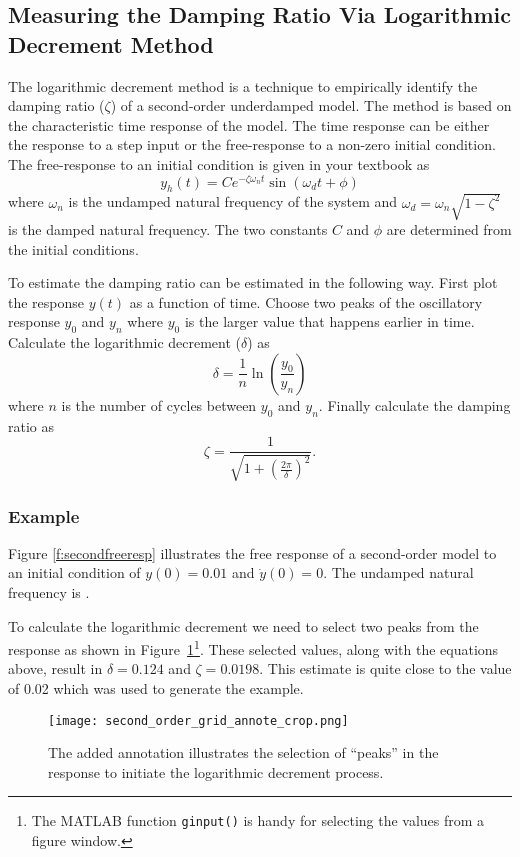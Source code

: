 \subsection{Measuring the Damping Ratio Via Logarithmic Decrement Method}

The logarithmic decrement method is a technique to empirically identify the damping ratio ($\zeta$) of a second-order underdamped model.  The method is based on the characteristic time response of the model.  The time response can be either the response to a step input or the free-response to a non-zero initial condition.  The free-response to an initial condition is given in your textbook as
\begin{equation}
y_h(t)=C e^{-\zeta\omega_nt}\sin\left(\omega_dt+\phi\right) 
\end{equation}
where $\omega_n$ is the undamped natural frequency of the system and $\omega_d=\omega_n\sqrt{1-\zeta^2}$ is the damped natural frequency.  The two constants $C$ and $\phi$ are determined from the initial conditions.

To estimate the damping ratio can be estimated in the following way.  First plot the response $y(t)$ as a function of time.  Choose two peaks of the oscillatory response $y_0$ and $y_n$ where $y_0$ is the larger value that happens earlier in time.  Calculate the logarithmic decrement ($\delta$) as
\[ \delta = \frac{1}{n}\ln\left(\frac{y_0}{y_n}\right) \]
where $n$ is the number of cycles between $y_0$ and $y_n$.
Finally calculate the damping ratio as
\[ \zeta = \frac{1}{\sqrt{1+\left(\frac{2\pi}{\delta}\right)^2}}. \]

\subsubsection{Example}
Figure \ref{f:secondfreeresp} illustrates the free response of a second-order model to an initial condition of $y(0)=0.01$ and $\dot{y}(0)=0$.  The undamped natural frequency is .

To calculate the logarithmic decrement we need to select two peaks from the response as shown in Figure~\ref{f:resp2}\footnote{The MATLAB function \texttt{ginput()} is handy for selecting the values from a figure window.}. These selected values, along with the equations above, result in $\delta=0.124$ and $\zeta=0.0198$.  This estimate is quite close to the value of 0.02 which was used to generate the example.

\begin{figure}[h!bt]
\centerline{
{\texttt{[image: second\_order\_grid\_annote\_crop.png]}}}
\caption{The added annotation illustrates the selection of ``peaks'' in the response to initiate the logarithmic decrement process.}
\label{f:resp2}
\end{figure}

